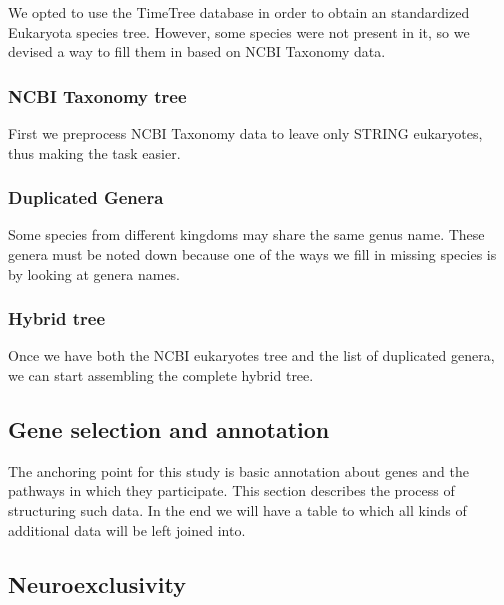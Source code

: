 \documentclass[
]{article}
\begin{document}
We opted to use the TimeTree database in order to obtain an standardized
Eukaryota species tree. However, some species were not present in it, so
we devised a way to fill them in based on NCBI Taxonomy data.

\hypertarget{ncbi-taxonomy-tree}{%
\subsubsection{NCBI Taxonomy tree}\label{ncbi-taxonomy-tree}}

First we preprocess NCBI Taxonomy data to leave only STRING eukaryotes,
thus making the task easier. 

\hypertarget{duplicated-genera}{%
\subsubsection{Duplicated Genera}\label{duplicated-genera}}

Some species from different kingdoms may share the same genus name.
These genera must be noted down because one of the ways we fill in
missing species is by looking at genera names.


\hypertarget{hybrid-tree}{%
\subsubsection{Hybrid tree}\label{hybrid-tree}}

Once we have both the NCBI eukaryotes tree and the list of duplicated
genera, we can start assembling the complete hybrid tree.


\hypertarget{gene-selection-and-annotation}{%
\subsection{Gene selection and
annotation}\label{gene-selection-and-annotation}}

The anchoring point for this study is basic annotation about genes and
the pathways in which they participate. This section describes the
process of structuring such data. In the end we will have a table to
which all kinds of additional data will be left joined into.


\hypertarget{neuroexclusivity}{%
\subsection{Neuroexclusivity}\label{neuroexclusivity}}
\end{document}
